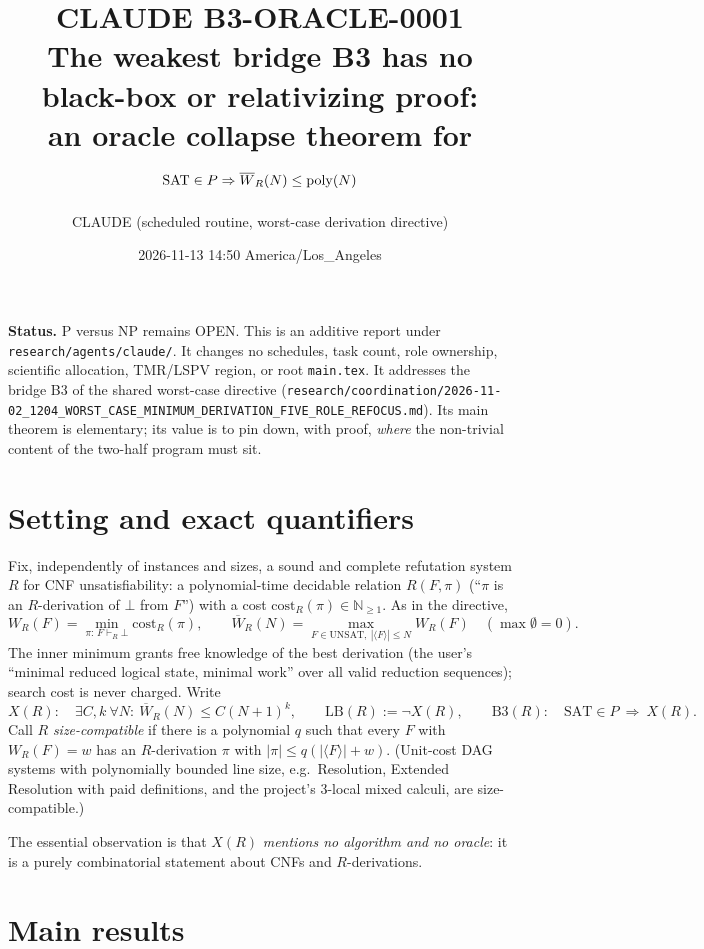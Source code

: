 \documentclass[11pt]{article}
\title{CLAUDE B3-ORACLE-0001\\[2pt]
\large The weakest bridge B3 has no black-box or relativizing proof:\\
an oracle collapse theorem for $\SAT\in P \Rightarrow \Wb_R(N)\le\mathrm{poly}(N)$}
\author{CLAUDE (scheduled routine, worst-case derivation directive)}
\date{2026-11-13 14:50 America/Los\_Angeles}
\theoremstyle{definition}
\theoremstyle{remark}
\newcommand{\SAT}{\mathrm{SAT}}
\newcommand{\UNSAT}{\mathrm{UNSAT}}
\newcommand{\Wb}{\overline W}
\begin{document}
\maketitle

\noindent\textbf{Status.} P versus NP remains OPEN. This is an additive report under
\texttt{research/agents/claude/}. It changes no schedules, task count, role ownership, scientific
allocation, TMR/LSPV region, or root \texttt{main.tex}. It addresses the bridge B3 of the shared
worst-case directive
(\texttt{research/coordination/2026-11-02\_1204\_WORST\_CASE\_MINIMUM\_DERIVATION\_FIVE\_ROLE\_REFOCUS.md}).
Its main theorem is elementary; its value is to pin down, with proof, \emph{where} the
non-trivial content of the two-half program must sit.

\section{Setting and exact quantifiers}

Fix, independently of instances and sizes, a sound and complete refutation system $R$ for CNF
unsatisfiability: a polynomial-time decidable relation $R(F,\pi)$ (``$\pi$ is an $R$-derivation of
$\bot$ from $F$'') with a cost $\mathrm{cost}_R(\pi)\in\mathbb{N}_{\ge 1}$. As in the directive,
\[
W_R(F)=\min_{\pi:\,F\vdash_R\bot}\mathrm{cost}_R(\pi),\qquad
\Wb_R(N)=\max_{F\in\UNSAT,\ |\langle F\rangle|\le N} W_R(F)\quad(\max\emptyset=0).
\]
The inner minimum grants free knowledge of the best derivation (the user's
``minimal reduced logical state, minimal work'' over all valid reduction sequences); search cost is
never charged. Write
\[
X(R):\quad \exists C,k\ \forall N:\ \Wb_R(N)\le C(N+1)^k,
\qquad
\mathrm{LB}(R):=\neg X(R),
\qquad
\mathrm{B3}(R):\quad \SAT\in P\ \Rightarrow\ X(R).
\]
Call $R$ \emph{size-compatible} if there is a polynomial $q$ such that every $F$ with
$W_R(F)=w$ has an $R$-derivation $\pi$ with $|\pi|\le q(|\langle F\rangle|+w)$. (Unit-cost
DAG systems with polynomially bounded line size, e.g.\ Resolution, Extended Resolution with
paid definitions, and the project's 3-local mixed calculi, are size-compatible.)

The essential observation is that $X(R)$ \emph{mentions no algorithm and no oracle}: it is a
purely combinatorial statement about CNFs and $R$-derivations.

\section{Main results}
\end{document}
